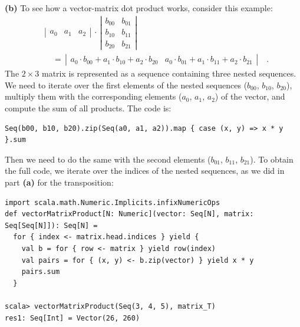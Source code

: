\textbf{(b)} To see how a vector-matrix dot product
works, consider this example:
\begin{align*}
 & \left|\begin{array}{ccc}
a_{0} & a_{1} & a_{2}\end{array}\right|\,\cdot\,\left|\begin{array}{cc}
b_{00} & b_{01}\\
b_{10} & b_{11}\\
b_{20} & b_{21}
\end{array}\right|\\
 & \quad=\,\left|\begin{array}{cc}
a_{0}\cdot b_{00}+a_{1}\cdot b_{10}+a_{2}\cdot b_{20} & a_{0}\cdot b_{01}+a_{1}\cdot b_{11}+a_{2}\cdot b_{21}\end{array}\right|\quad.
\end{align*}
The $2\times3$ matrix is represented as a sequence containing three
nested sequences. We need to iterate over the first elements of the
nested sequences ($b_{00}$, $b_{10}$, $b_{20}$), multiply them
with the corresponding elements ($a_{0}$, $a_{1}$, $a_{2}$) of
the vector, and compute the sum of all products. The code is:
\begin{lstlisting}
Seq(b00, b10, b20).zip(Seq(a0, a1, a2)).map { case (x, y) => x * y }.sum
\end{lstlisting}
Then we need to do the same with the second elements ($b_{01}$, $b_{11}$,
$b_{21}$). To obtain the full code, we iterate over the indices of
the nested sequences, as we did in part \textbf{(a)} for the transposition:
\begin{lstlisting}
import scala.math.Numeric.Implicits.infixNumericOps
def vectorMatrixProduct[N: Numeric](vector: Seq[N], matrix: Seq[Seq[N]]): Seq[N] =
  for { index <- matrix.head.indices } yield {
    val b = for { row <- matrix } yield row(index)
    val pairs = for { (x, y) <- b.zip(vector) } yield x * y 
    pairs.sum
  }

scala> vectorMatrixProduct(Seq(3, 4, 5), matrix_T)
res1: Seq[Int] = Vector(26, 260)
\end{lstlisting}

